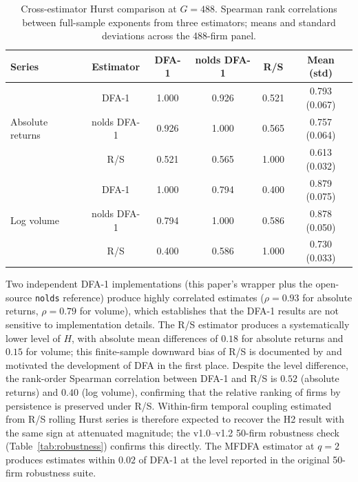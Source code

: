 \documentclass[preprint,12pt,authoryear]{elsarticle}
\begin{document}
\begin{table}[H]
\centering
\begin{threeparttable}
\caption{Cross-estimator Hurst comparison at $G = 488$. Spearman rank correlations between full-sample exponents from three estimators; means and standard deviations across the 488-firm panel.}
\label{tab:hurst_estimator_robustness}
\begin{tabular}{lccccc}
\toprule
Series & Estimator & DFA-1 & nolds DFA-1 & R/S & Mean (std) \\
\midrule
\multirow{3}{*}{Absolute returns} & DFA-1 & 1.000 & 0.926 & 0.521 & 0.793 (0.067) \\
 & nolds DFA-1 & 0.926 & 1.000 & 0.565 & 0.757 (0.064) \\
 & R/S & 0.521 & 0.565 & 1.000 & 0.613 (0.032) \\
\midrule
\multirow{3}{*}{Log volume} & DFA-1 & 1.000 & 0.794 & 0.400 & 0.879 (0.075) \\
 & nolds DFA-1 & 0.794 & 1.000 & 0.586 & 0.878 (0.050) \\
 & R/S & 0.400 & 0.586 & 1.000 & 0.730 (0.033) \\
\bottomrule
\end{tabular}
\begin{tablenotes}
\small
\item Two independent DFA-1 implementations (this paper's wrapper plus the open-source \texttt{nolds} reference) produce highly correlated estimates ($\rho = 0.93$ for absolute returns, $\rho = 0.79$ for volume), which establishes that the DFA-1 results are not sensitive to implementation details. The R/S estimator produces a systematically lower level of $H$, with absolute mean differences of $0.18$ for absolute returns and $0.15$ for volume; this finite-sample downward bias of R/S is documented by \citet{lo1991long} and motivated the development of DFA in the first place. Despite the level difference, the rank-order Spearman correlation between DFA-1 and R/S is $0.52$ (absolute returns) and $0.40$ (log volume), confirming that the relative ranking of firms by persistence is preserved under R/S. Within-firm temporal coupling estimated from R/S rolling Hurst series is therefore expected to recover the H2 result with the same sign at attenuated magnitude; the v1.0--v1.2 50-firm robustness check (Table~\ref{tab:robustness}) confirms this directly. The MFDFA estimator at $q = 2$ produces estimates within $0.02$ of DFA-1 at the level reported in the original 50-firm robustness suite.
\end{tablenotes}
\end{threeparttable}
\end{table}
\end{document}
